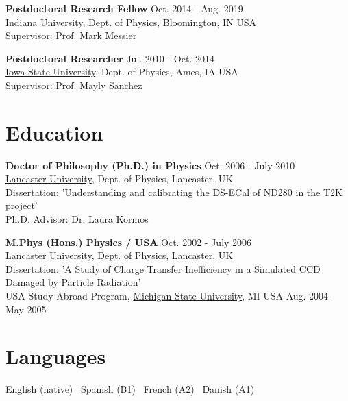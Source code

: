 \documentclass[margin, line]{res}
\newcommand{\IU}{https://physics.indiana.edu/}
\newcommand{\ISU}{https://www.physastro.iastate.edu/}
\newcommand{\Lancs}{https://www.lancaster.ac.uk/physics/}
\newcommand{\MSU}{https://pa.msu.edu/}
\newenvironment{list2}{
	\begin{list}{$\bullet$}{%
		\setlength{\itemsep}{0in}
		\setlength{\parsep}{0in} \setlength{\parskip}{0in}
		\setlength{\topsep}{0in} \setlength{\partopsep}{0in}
		\setlength{\leftmargin}{0.2in}}}{\end{list}}
\renewcommand{\em}{\upshape\sffamily}
\begin{document}
\begin{resume}
{\bf Postdoctoral Research Fellow} \hfill{Oct. 2014 - Aug. 2019}\\
\href{\IU}{Indiana University}, {\em Dept. of Physics, Bloomington, IN USA}\\
{\em Supervisor: Prof. Mark Messier}\\
\vspace{-.5cm}

{\bf Postdoctoral Researcher} \hfill{ Jul. 2010 - Oct. 2014}\\
\href{\ISU}{Iowa State University}, {\em Dept. of Physics, Ames, IA USA}\\
{\em Supervisor: Prof. Mayly Sanchez}\\
\vspace{-.5cm}

\section{\sc Education}
{\bf Doctor of Philosophy (Ph.D.) in Physics} \hfill {Oct. 2006 - July 2010}\\
\href{\Lancs}{Lancaster University}, {\em Dept. of Physics, Lancaster, UK}\\
{\em Dissertation:} 'Understanding and calibrating the DS-ECal of ND280 in the T2K project'\\
{\em Ph.D. Advisor: Dr. Laura Kormos}\\
\vspace{-.5cm}

{\bf M.Phys (Hons.) Physics / USA} \hfill {Oct. 2002 - July 2006}\\
\href{\Lancs}{Lancaster University}, {\em Dept. of Physics, Lancaster, UK}\\
{\em Dissertation:} 'A Study of Charge Transfer Inefficiency in a
Simulated CCD Damaged by Particle Radiation'\\
{\em USA Study Abroad Program,} \href{\MSU}{Michigan State University}{\em , MI USA} \hfill {Aug. 2004 - May 2005}\\

\section{\sc Languages}
English (native) \textperiodcentered\ Spanish (B1) \textperiodcentered\ French (A2) \textperiodcentered\ Danish (A1)


\end{resume}
\end{document}
